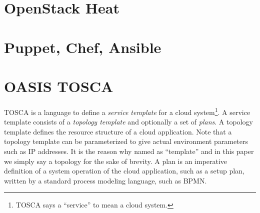 \documentclass[12pt]{report}
\begin{document}
\section{OpenStack Heat}
\label{sec:heat}

\section{Puppet, Chef, Ansible}
\label{sec:PCA}

\section{OASIS TOSCA}
\label{sec:TOSCA}
TOSCA is a language to define a {\it service template} for a cloud
system\footnote{TOSCA says a ``service'' to mean a cloud system.}. A
service template consists of a {\it topology template} and optionally
a set of {\it plans}. A topology template defines the resource
structure of a cloud application. Note that a topology template can be
parameterized to give actual environment parameters such as IP
addresses. It is the reason why named as ``template'' and in this
paper we simply say a topology for the sake of brevity. A plan is an
imperative definition of a system operation of the cloud application,
such as a setup plan, written by a standard process modeling language,
such as BPMN.
\end{document}
